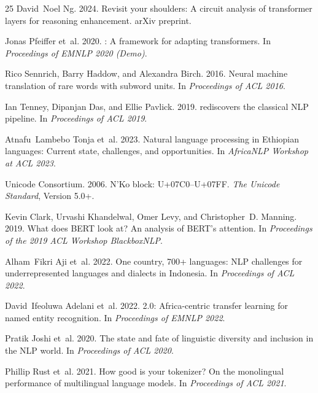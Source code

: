 \documentclass[11pt]{article}
\begin{document}
\begin{thebibliography}{25}
David~Noel Ng. 2024.
\newblock Revisit your shoulders: A circuit analysis of transformer layers for reasoning enhancement.
\newblock arXiv preprint.

Jonas Pfeiffer et~al. 2020.
: A framework for adapting transformers.
\newblock In \emph{Proceedings of EMNLP 2020 (Demo)}.

Rico Sennrich, Barry Haddow, and Alexandra Birch. 2016.
\newblock Neural machine translation of rare words with subword units.
\newblock In \emph{Proceedings of ACL 2016}.

Ian Tenney, Dipanjan Das, and Ellie Pavlick. 2019.
 rediscovers the classical {NLP} pipeline.
\newblock In \emph{Proceedings of ACL 2019}.

Atnafu~Lambebo Tonja et~al. 2023.
\newblock Natural language processing in {Ethiopian} languages: Current state, challenges, and opportunities.
\newblock In \emph{AfricaNLP Workshop at ACL 2023}.

{Unicode Consortium}. 2006.
\newblock N'Ko block: {U+07C0--U+07FF}.
\newblock \emph{The Unicode Standard}, Version 5.0+.

Kevin Clark, Urvashi Khandelwal, Omer Levy, and Christopher~D. Manning. 2019.
\newblock What does {BERT} look at? {An} analysis of {BERT}'s attention.
\newblock In \emph{Proceedings of the 2019 ACL Workshop BlackboxNLP}.

Alham~Fikri Aji et~al. 2022.
\newblock One country, 700+ languages: {NLP} challenges for underrepresented languages and dialects in {Indonesia}.
\newblock In \emph{Proceedings of ACL 2022}.

David~Ifeoluwa Adelani et~al. 2022.
 2.0: {Africa}-centric transfer learning for named entity recognition.
\newblock In \emph{Proceedings of EMNLP 2022}.

Pratik Joshi et~al. 2020.
\newblock The state and fate of linguistic diversity and inclusion in the {NLP} world.
\newblock In \emph{Proceedings of ACL 2020}.

Phillip Rust et~al. 2021.
\newblock How good is your tokenizer? {On} the monolingual performance of multilingual language models.
\newblock In \emph{Proceedings of ACL 2021}.


\end{thebibliography}
\end{document}
